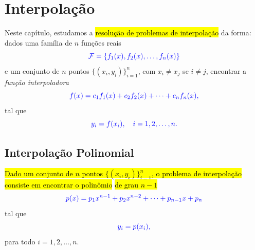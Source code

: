 \chapter{Interpolação}\label{cap_interp}

Neste capítulo, estudamos a \hl{resolução de problemas de interpolação} da forma: dados uma família de $n$ funções reais
\begin{equation}\color{blue}\mathcal{F} = \{f_1(x), f_2(x), \dotsc, f_n(x)\}
\end{equation}
e um conjunto de $n$ pontos $\{(x_i, y_i)\}_{i=1}^n$, com $x_i\neq x_j$ se $i\neq j$, encontrar a \emph{função interpoladora}
\begin{equation}\color{blue}f(x) = c_1f_1(x) + c_2f_2(x) + \cdots + c_nf_n(x),
\end{equation}
tal que
\begin{equation}\color{blue}y_i = f(x_i),\quad i=1, 2, \ldots, n.
\end{equation}

\section{Interpolação Polinomial}\label{cap_interp_sec_interpoli}

\hl{Dado um conjunto de $n$ pontos $\{(x_i, y_i)\}_{i=1}^n$, o problema de interpolação consiste em encontrar o polinômio} \hl{de grau $n-1$}
\begin{equation}\label{cap_interp_sec_interpoli:eq:interpoli_poli}\color{blue}p(x) = p_1x^{n-1} + p_2x^{n-2} + \cdots + p_{n-1}x + p_n
\end{equation}
tal que
\begin{equation}\label{cap_interp_sec_interpoli:eq:interpoli_conds}\color{blue}y_i = p(x_i),
\end{equation}
para todo $i=1, 2, \dotsc, n$.

